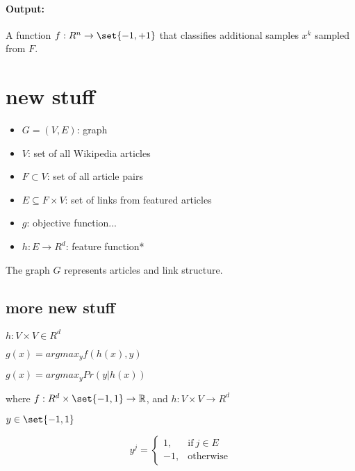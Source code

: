 

\paragraph{Output:}
A function $f: R^n \to \set{-1,+1}$ that classifies additional samples ${x^k}$ sampled from $F$.



\section{new stuff}


\begin{itemize}
\item $G = (V, E)$: graph
\item $V$: set of all Wikipedia articles
\item $F \subset V$: set of all article pairs
\item $E \subseteq F \times V$: set of links from featured articles
\item $g$: objective function...
\item $h: E \to R^d$: feature function*
\end{itemize}


The graph $G$ represents articles and link structure.


\subsection{more new stuff}

$h: V \times V \in R^d$ %

$g(x) = arg max_y f(h(x), y)$

$g(x) = arg max_y Pr(y | h(x))$

where $f: R^d \times \set{-1,1} \to \mathbb{R}$, and $h: V \times V \to R^d$

$y \in \set{-1,1}$

\begin{equation}
  y^j =
  \begin{cases}
    1, & \text{if}\ j \in E \\
    -1, & \text{otherwise}
  \end{cases}
\end{equation}

